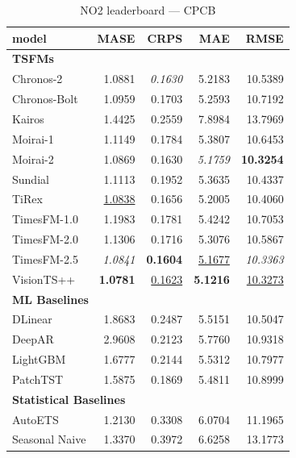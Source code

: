 \begin{table}[H]
\caption{NO2 leaderboard --- CPCB}
\centering
\begin{small}
\begin{tabular}{lrrrr}
\toprule
model & MASE & CRPS & MAE & RMSE \\
\midrule
\multicolumn{5}{l}{\textbf{TSFMs}} \\
Chronos-2 & 1.0881 & \textit{0.1630} & 5.2183 & 10.5389 \\
Chronos-Bolt & 1.0959 & 0.1703 & 5.2593 & 10.7192 \\
Kairos & 1.4425 & 0.2559 & 7.8984 & 13.7969 \\
Moirai-1 & 1.1149 & 0.1784 & 5.3807 & 10.6453 \\
Moirai-2 & 1.0869 & 0.1630 & \textit{5.1759} & \textbf{10.3254} \\
Sundial & 1.1113 & 0.1952 & 5.3635 & 10.4337 \\
TiRex & \underline{1.0838} & 0.1656 & 5.2005 & 10.4060 \\
TimesFM-1.0 & 1.1983 & 0.1781 & 5.4242 & 10.7053 \\
TimesFM-2.0 & 1.1306 & 0.1716 & 5.3076 & 10.5867 \\
TimesFM-2.5 & \textit{1.0841} & \textbf{0.1604} & \underline{5.1677} & \textit{10.3363} \\
VisionTS++ & \textbf{1.0781} & \underline{0.1623} & \textbf{5.1216} & \underline{10.3273} \\
\midrule
\multicolumn{5}{l}{\textbf{ML Baselines}} \\
DLinear & 1.8683 & 0.2487 & 5.5151 & 10.5047 \\
DeepAR & 2.9608 & 0.2123 & 5.7760 & 10.9318 \\
LightGBM & 1.6777 & 0.2144 & 5.5312 & 10.7977 \\
PatchTST & 1.5875 & 0.1869 & 5.4811 & 10.8999 \\
\midrule
\multicolumn{5}{l}{\textbf{Statistical Baselines}} \\
AutoETS & 1.2130 & 0.3308 & 6.0704 & 11.1965 \\
Seasonal Naive & 1.3370 & 0.3972 & 6.6258 & 13.1773 \\
\bottomrule
\end{tabular}
\end{small}
\end{table}